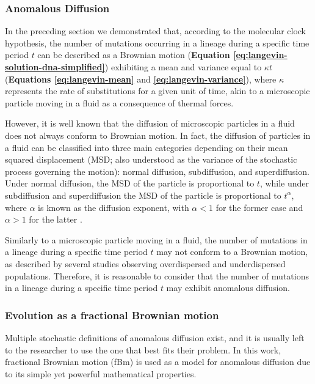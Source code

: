 \subsubsection{Anomalous Diffusion}

In the preceding section we demonstrated that, according to the molecular clock hypothesis, the number of mutations occurring in a lineage during a specific time period $t$ can be described as a Brownian motion (\textbf{Equation \ref{eq:langevin-solution-dna-simplified}}) exhibiting a mean and variance equal to $\kappa t$ (\textbf{Equations \ref{eq:langevin-mean}} and \textbf{\ref{eq:langevin-variance}}), where $\kappa$ represents the rate of substitutions for a given unit of time, akin to a microscopic particle moving in a fluid as a consequence of thermal forces.

However, it is well known that the diffusion of microscopic particles in a fluid does not always conform to Brownian motion. In fact, the diffusion of particles in a fluid can be classified into three main categories depending on their mean squared displacement (MSD; also understood as the variance of the stochastic process governing the motion): normal diffusion, subdiffusion, and superdiffusion. Under normal diffusion, the MSD of the particle is proportional to $t$, while under subdiffusion and superdiffusion the MSD of the particle is proportional to $t^\alpha$, where $\alpha$ is known as the diffusion exponent, with $\alpha < 1$ for the former case and $\alpha > 1$ for the latter \cite{munoz2021}.

Similarly to a microscopic particle moving in a fluid, the number of mutations in a lineage during a specific time period $t$ may not conform to a Brownian motion, as described by several studies observing overdispersed and underdispersed populations. Therefore, it is reasonable to consider that the number of mutations in a lineage during a specific time period $t$ may exhibit anomalous diffusion.

\subsubsection{Evolution as a fractional Brownian motion}

Multiple stochastic definitions of anomalous diffusion exist, and it is usually left to the researcher to use the one that best fits their problem. In this work, fractional Brownian motion (fBm) is used as a model for anomalous diffusion due to its simple yet powerful mathematical properties.


